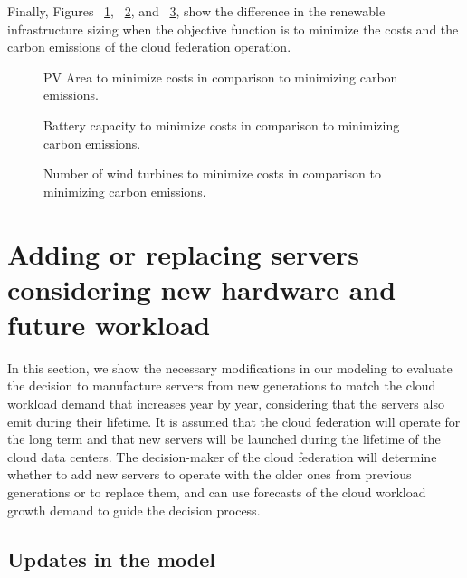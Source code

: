 Finally, Figures ~\ref{fig:pv_co2_costs},  ~\ref{fig:bat_co2_costs}, and ~\ref{fig:wt_co2_costs}, show the difference in the renewable infrastructure sizing when the objective function is to minimize the costs and the carbon emissions of the cloud federation operation.

\begin{figure}[H]
  \centering
  {}
  \caption{PV Area to minimize costs in comparison to minimizing carbon emissions. }
  \label{fig:pv_co2_costs}
\end{figure}


\begin{figure}[H]
  \centering
  {}
  \caption{Battery capacity to minimize costs in comparison to minimizing carbon emissions.  }
  \label{fig:bat_co2_costs}
\end{figure}

\begin{figure}[H]
  \centering
  {}
  \caption{Number of wind turbines  to minimize costs in comparison to minimizing carbon emissions.}
  \label{fig:wt_co2_costs}
\end{figure}


\section{Adding or replacing servers considering new hardware and future workload }
\label{sec:new_servers}

In this section, we show the necessary modifications in our modeling to evaluate the decision to manufacture servers from new generations to match the cloud workload demand that increases year by year, considering that the servers also emit  during their lifetime. It is assumed that the cloud federation will operate for the long term and that new servers will be launched during the lifetime of the cloud data centers. The decision-maker of the cloud federation will determine whether to add new servers to operate with the older ones from previous generations or to replace them, and can use forecasts of the cloud workload growth demand to guide the decision process.
\subsection{Updates in the model}

